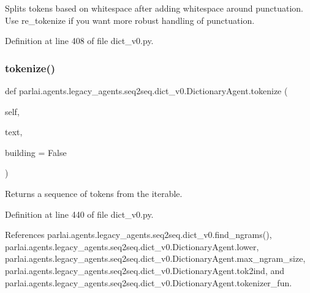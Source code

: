 \begin{DoxyVerb}Splits tokens based on whitespace after adding whitespace around
punctuation.
Use re_tokenize if you want more robust handling of punctuation.
\end{DoxyVerb}
 

Definition at line 408 of file dict\+\_\+v0.\+py.

\mbox{\label{classparlai_1_1agents_1_1legacy__agents_1_1seq2seq_1_1dict__v0_1_1DictionaryAgent_aa551af633278b71b0a8da65180b79202}} 
\subsubsection{\texorpdfstring{tokenize()}{tokenize()}}
{\footnotesize\ttfamily def parlai.\+agents.\+legacy\+\_\+agents.\+seq2seq.\+dict\+\_\+v0.\+Dictionary\+Agent.\+tokenize (\begin{DoxyParamCaption}\item[{}]{self,  }\item[{}]{text,  }\item[{}]{building = {\ttfamily False} }\end{DoxyParamCaption})}

\begin{DoxyVerb}Returns a sequence of tokens from the iterable.\end{DoxyVerb}
 

Definition at line 440 of file dict\+\_\+v0.\+py.



References parlai.\+agents.\+legacy\+\_\+agents.\+seq2seq.\+dict\+\_\+v0.\+find\+\_\+ngrams(), parlai.\+agents.\+legacy\+\_\+agents.\+seq2seq.\+dict\+\_\+v0.\+Dictionary\+Agent.\+lower, parlai.\+agents.\+legacy\+\_\+agents.\+seq2seq.\+dict\+\_\+v0.\+Dictionary\+Agent.\+max\+\_\+ngram\+\_\+size, parlai.\+agents.\+legacy\+\_\+agents.\+seq2seq.\+dict\+\_\+v0.\+Dictionary\+Agent.\+tok2ind, and parlai.\+agents.\+legacy\+\_\+agents.\+seq2seq.\+dict\+\_\+v0.\+Dictionary\+Agent.\+tokenizer\+\_\+fun.



